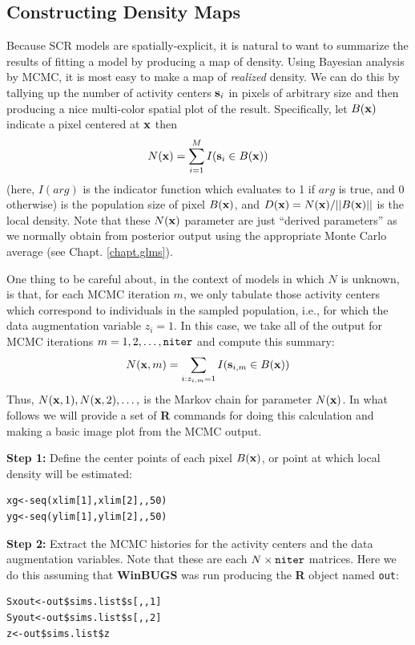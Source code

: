 \subsection{Constructing Density Maps}
\label{scr0.sec.mapping}

Because SCR models are spatially-explicit, it is natural to want to
summarize the results of fitting a model by producing a map of
density.  Using Bayesian analysis by MCMC, it is most easy to make a
map of {\it realized} density.  We can do this by tallying up the
number of activity centers ${\bf s}_{i}$ in pixels of arbitrary size
and then producing a nice multi-color spatial plot of the result.
Specifically, let $B({\bf x})$ indicate a pixel centered at ${\bf x}$
then
\[
N({\bf x})=\sum_{i=1}^{M} I({\bf s}_{i} \in B({\bf x}))
\]
(here, $I(arg)$ is the indicator function which evaluates to 1 if
$arg$ is true, and 0 otherwise)
is the population size of pixel  $B({\bf x})$, and $D({\bf x}) = N({\bf
  x})/||B({\bf x})||$ is the local density.
Note that these $N({\bf x})$ parameter are just ``derived
parameters'' as we normally obtain from posterior output using the
appropriate Monte Carlo average (see Chapt.  \ref{chapt.glms}).

One thing to be careful about, in the context of models in which $N$
is unknown, is that, for each MCMC iteration $m$, we only tabulate
those activity centers which correspond to individuals in the sampled
population, i.e., for which the data augmentation variable $z_{i} =
1$.  In this case, we take all of the output for MCMC iterations
$m=1,2,\ldots,\mbox{\tt niter}$ and compute this summary:
\[
   N({\bf x},m) = \sum_{i: z_{i,m}=1} I({\bf s}_{i,m} \in B({\bf x}))
\]
Thus, $N({\bf x},1),N({\bf x},2),\dots,$ is the Markov chain for
parameter $N({\bf x})$.  In what follows we will provide a set of {\bf
  R} commands for doing this calculation and making a basic image
plot from the MCMC output.

{\flushleft \bf Step 1:} Define the center points of each pixel $B({\bf
  x})$, or point at which local density will be estimated:
\begin{verbatim}
xg<-seq(xlim[1],xlim[2],,50)
yg<-seq(ylim[1],ylim[2],,50)
\end{verbatim}

{\flushleft \bf Step 2:} Extract the MCMC histories for the activity
centers and the data augmentation variables.  Note that these are each
$N \times \mbox{\tt niter}$ matrices. Here we do this assuming that
{\bf WinBUGS} was run producing the {\bf R} object named \mbox{\tt out}:
\begin{verbatim}
Sxout<-out$sims.list$s[,,1]
Syout<-out$sims.list$s[,,2]
z<-out$sims.list$z
\end{verbatim}

